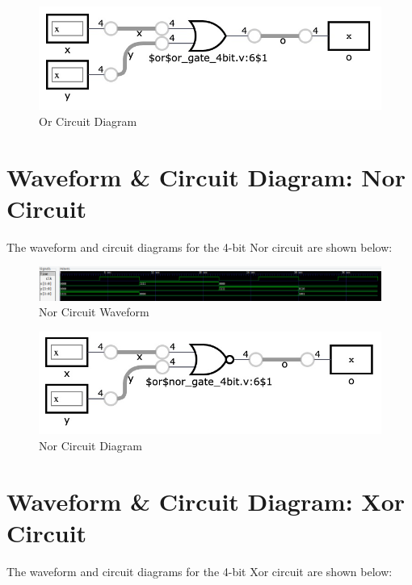 \documentclass[runningheads, 12pt]{report}
\begin{document}
\begin{figure}[h]
	\centering
	\includegraphics[width=1.0\textwidth]{or_4bit}
	\caption{Or Circuit Diagram}
	\label{fig: or_4bit}
\end{figure}
\pagebreak

	\section{Waveform \& Circuit Diagram: Nor Circuit}
	
	The waveform and circuit diagrams for the 4-bit Nor circuit are shown below:
	
\begin{figure}[h]
	\centering
	\includegraphics[scale=0.65]{gtk_nor_4bit}
	\caption{Nor Circuit Waveform}
	\label{fig: gtk_nor_4bit}
\end{figure}

\begin{figure}[h]
	\centering
	\includegraphics[width=1.0\textwidth]{nor_4bit}
	\caption{Nor Circuit Diagram}
	\label{fig: nor_4bit}
\end{figure}
\pagebreak

	\section{Waveform \& Circuit Diagram: Xor Circuit}
	
	The waveform and circuit diagrams for the 4-bit Xor circuit are shown below:
	
\end{document}
